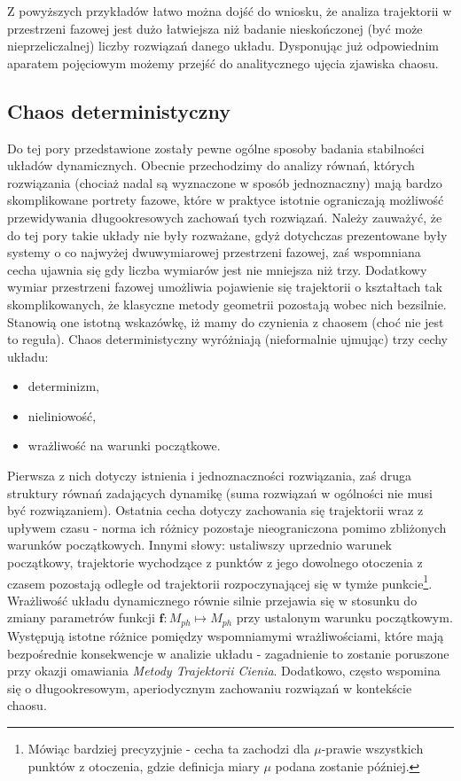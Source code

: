 \documentclass[12pt]{article}
\begin{document}
Z powyższych przykładów łatwo można dojść do wniosku, że analiza trajektorii w przestrzeni fazowej jest dużo łatwiejsza niż badanie nieskończonej (być może nieprzeliczalnej) liczby rozwiązań danego układu. Dysponując już odpowiednim aparatem pojęciowym możemy przejść do analitycznego ujęcia zjawiska chaosu.
\subsection{Chaos deterministyczny}
Do tej pory przedstawione zostały pewne ogólne sposoby badania stabilności układów dynamicznych. Obecnie przechodzimy do analizy równań, których rozwiązania (chociaż nadal są wyznaczone w sposób jednoznaczny) mają bardzo skomplikowane portrety fazowe, które w praktyce istotnie ograniczają możliwość przewidywania długookresowych zachowań tych rozwiązań. Należy zauważyć, że do tej pory takie układy nie były rozważane, gdyż dotychczas prezentowane były systemy o co najwyżej dwuwymiarowej przestrzeni fazowej, zaś wspomniana cecha ujawnia się gdy liczba wymiarów jest nie mniejsza niż trzy. Dodatkowy wymiar przestrzeni fazowej umożliwia pojawienie się trajektorii o kształtach tak skomplikowanych, że klasyczne metody geometrii pozostają wobec nich bezsilnie. Stanowią one istotną wskazówkę, iż mamy do czynienia z chaosem (choć nie jest to reguła). \newline
Chaos deterministyczny wyróżniają (nieformalnie ujmując) trzy cechy układu:
\begin{itemize}
	\item determinizm,
	\item nieliniowość,
	\item wrażliwość na warunki początkowe.
\end{itemize} 
Pierwsza z nich dotyczy istnienia i jednoznaczności rozwiązania, zaś druga struktury równań zadających dynamikę (suma rozwiązań w ogólności nie musi być rozwiązaniem). Ostatnia cecha dotyczy zachowania się trajektorii wraz z upływem czasu - norma ich różnicy pozostaje nieograniczona pomimo zbliżonych warunków początkowych. Innymi słowy: ustaliwszy uprzednio warunek początkowy, trajektorie wychodzące z punktów z jego dowolnego otoczenia z czasem pozostają odległe od trajektorii rozpoczynającej się w tymże punkcie\footnote{Mówiąc bardziej precyzyjnie - cecha ta zachodzi dla $ \mu $-prawie wszystkich punktów z otoczenia, gdzie definicja miary $ \mu $ podana zostanie później.}. Wrażliwość układu dynamicznego równie silnie przejawia się w stosunku do zmiany parametrów funkcji  $ \textbf{f}:M_{ph} \mapsto M_{ph}  $ przy ustalonym warunku początkowym. Występują istotne różnice pomiędzy wspomniamymi wrażliwościami, które mają bezpośrednie konsekwencje w analizie układu - zagadnienie to zostanie poruszone przy okazji omawiania \textit{Metody Trajektorii Cienia}. Dodatkowo, często wspomina się o długookresowym, aperiodycznym zachowaniu rozwiązań w kontekście chaosu. \newline
\end{document}
